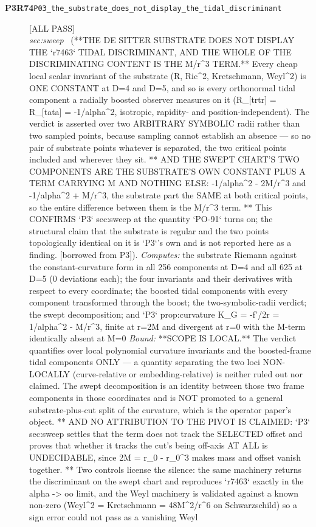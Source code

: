 \begin{description}
\item[\textbf{P3R74}\quad\texttt{P03\_the\_substrate\_does\_not\_display\_the\_tidal\_discriminant}]\hfill\textsf{[ALL PASS]}\\
\textit{sec:sweep} \ (**THE DE SITTER SUBSTRATE DOES NOT DISPLAY THE `r7463` TIDAL DISCRIMINANT, AND THE WHOLE OF THE DISCRIMINATING CONTENT IS THE M/r\textasciicircum{}3 TERM.** Every cheap local scalar invariant of the substrate (R, Ric\textasciicircum{}2, Kretschmann, Weyl\textasciicircum{}2) is ONE CONSTANT at D=4 and D=5, and so is every orthonormal tidal component a radially boosted observer measures on it (R\_[trtr] = R\_[tata] = -1/alpha\textasciicircum{}2, isotropic, rapidity- and position-independent). The verdict is asserted over two ARBITRARY SYMBOLIC radii rather than two sampled points, because sampling cannot establish an absence --- so no pair of substrate points whatever is separated, the two critical points included and wherever they sit. ** AND THE SWEPT CHART'S TWO COMPONENTS ARE THE SUBSTRATE'S OWN CONSTANT PLUS A TERM CARRYING M AND NOTHING ELSE: -1/alpha\textasciicircum{}2 - 2M/r\textasciicircum{}3 and -1/alpha\textasciicircum{}2 + M/r\textasciicircum{}3, the substrate part the SAME at both critical points, so the entire difference between them is the M/r\textasciicircum{}3 term. ** This CONFIRMS `P3` sec:sweep at the quantity `PO-91` turns on; the structural claim that the substrate is regular and the two points topologically identical on it is `P3`'s own and is not reported here as a finding. [borrowed from P3]). 
\emph{Computes:} the substrate Riemann against the constant-curvature form in all 256 components at D=4 and all 625 at D=5 (0 deviations each); the four invariants and their derivatives with respect to every coordinate; the boosted tidal components with every component transformed through the boost; the two-symbolic-radii verdict; the swept decomposition; and `P3` prop:curvature K\_G = -f'/2r = 1/alpha\textasciicircum{}2 - M/r\textasciicircum{}3, finite at r=2M and divergent at r=0 with the M-term identically absent at M=0
 \emph{Bound:} **SCOPE IS LOCAL.** The verdict quantifies over local polynomial curvature invariants and the boosted-frame tidal components ONLY --- a quantity separating the two loci NON-LOCALLY (curve-relative or embedding-relative) is neither ruled out nor claimed. The swept decomposition is an identity between those two frame components in those coordinates and is NOT promoted to a general substrate-plus-cut split of the curvature, which is the operator paper's object. ** AND NO ATTRIBUTION TO THE PIVOT IS CLAIMED: `P3` sec:sweep settles that the term does not track the SELECTED offset and proves that whether it tracks the cut's being off-axis AT ALL is UNDECIDABLE, since 2M = r\_0 - r\_0\textasciicircum{}3 makes mass and offset vanish together. ** Two controls license the silence: the same machinery returns the discriminant on the swept chart and reproduces `r7463` exactly in the alpha -> oo limit, and the Weyl machinery is validated against a known non-zero (Weyl\textasciicircum{}2 = Kretschmann = 48M\textasciicircum{}2/r\textasciicircum{}6 on Schwarzschild) so a sign error could not pass as a vanishing Weyl

\end{description}
